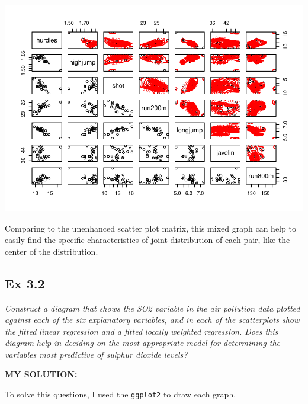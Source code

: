 \documentclass[
]{article}
\begin{document}
\includegraphics{HUDM6122-Homework_03-Chenguang-Pan_files/figure-latex/unnamed-chunk-1-1.pdf}

Comparing to the unenhanced scatter plot matrix, this mixed graph can
help to easily find the specific characteristics of joint distribution
of each pair, like the center of the distribution.

\hypertarget{ex-3.2}{%
\subsection{Ex 3.2}\label{ex-3.2}}

\emph{Construct a diagram that shows the SO2 variable in the air
pollution data plotted against each of the six explanatory variables,
and in each of the scatterplots show the fitted linear regression and a
fitted locally weighted regression. Does this diagram help in deciding
on the most appropriate model for determining the variables most
predictive of sulphur dioxide levels?}

\textbf{MY SOLUTION:}

To solve this questions, I used the \texttt{ggplot2} to draw each graph.
\end{document}
